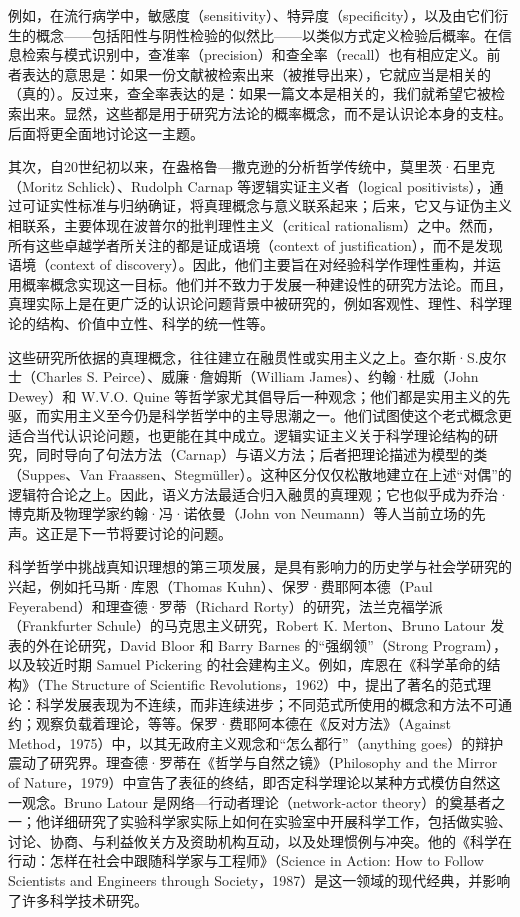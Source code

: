 例如，在流行病学中，敏感度（sensitivity）、特异度（specificity），以及由它们衍生的概念——包括阳性与阴性检验的似然比——以类似方式定义检验后概率。在信息检索与模式识别中，查准率（precision）和查全率（recall）也有相应定义。前者表达的意思是：如果一份文献被检索出来（被推导出来），它就应当是相关的（真的）。反过来，查全率表达的是：如果一篇文本是相关的，我们就希望它被检索出来。显然，这些都是用于研究方法论的概率概念，而不是认识论本身的支柱。后面将更全面地讨论这一主题。

其次，自20世纪初以来，在盎格鲁—撒克逊的分析哲学传统中，莫里茨·石里克（Moritz Schlick）、Rudolph Carnap 等逻辑实证主义者（logical positivists），通过可证实性标准与归纳确证，将真理概念与意义联系起来；后来，它又与证伪主义相联系，主要体现在波普尔的批判理性主义（critical rationalism）之中。然而，所有这些卓越学者所关注的都是证成语境（context of justification），而不是发现语境（context of discovery）。因此，他们主要旨在对经验科学作理性重构，并运用概率概念实现这一目标。他们并不致力于发展一种建设性的研究方法论。而且，真理实际上是在更广泛的认识论问题背景中被研究的，例如客观性、理性、科学理论的结构、价值中立性、科学的统一性等。

这些研究所依据的真理概念，往往建立在融贯性或实用主义之上。查尔斯·S.皮尔士（Charles S. Peirce）、威廉·詹姆斯（William James）、约翰·杜威（John Dewey）和 W.V.O. Quine 等哲学家尤其倡导后一种观念；他们都是实用主义的先驱，而实用主义至今仍是科学哲学中的主导思潮之一。他们试图使这个老式概念更适合当代认识论问题，也更能在其中成立。逻辑实证主义关于科学理论结构的研究，同时导向了句法方法（Carnap）与语义方法；后者把理论描述为模型的类（Suppes、Van Fraassen、Stegmüller）。这种区分仅仅松散地建立在上述“对偶”的逻辑符合论之上。因此，语义方法最适合归入融贯的真理观；它也似乎成为乔治·博克斯及物理学家约翰·冯·诺依曼（John von Neumann）等人当前立场的先声。这正是下一节将要讨论的问题。

科学哲学中挑战真知识理想的第三项发展，是具有影响力的历史学与社会学研究的兴起，例如托马斯·库恩（Thomas Kuhn）、保罗·费耶阿本德（Paul Feyerabend）和理查德·罗蒂（Richard Rorty）的研究，法兰克福学派（Frankfurter Schule）的马克思主义研究，Robert K. Merton、Bruno Latour 发表的外在论研究，David Bloor 和 Barry Barnes 的“强纲领”（Strong Program），以及较近时期 Samuel Pickering 的社会建构主义。例如，库恩在《科学革命的结构》（The Structure of Scientific Revolutions，1962）中，提出了著名的范式理论：科学发展表现为不连续，而非连续进步；不同范式所使用的概念和方法不可通约；观察负载着理论，等等。保罗·费耶阿本德在《反对方法》（Against Method，1975）中，以其无政府主义观念和“怎么都行”（anything goes）的辩护震动了研究界。理查德·罗蒂在《哲学与自然之镜》（Philosophy and the Mirror of Nature，1979）中宣告了表征的终结，即否定科学理论以某种方式模仿自然这一观念。Bruno Latour 是网络—行动者理论（network-actor theory）的奠基者之一；他详细研究了实验科学家实际上如何在实验室中开展科学工作，包括做实验、讨论、协商、与利益攸关方及资助机构互动，以及处理惯例与冲突。他的《科学在行动：怎样在社会中跟随科学家与工程师》（Science in Action: How to Follow Scientists and Engineers through Society，1987）是这一领域的现代经典，并影响了许多科学技术研究。

